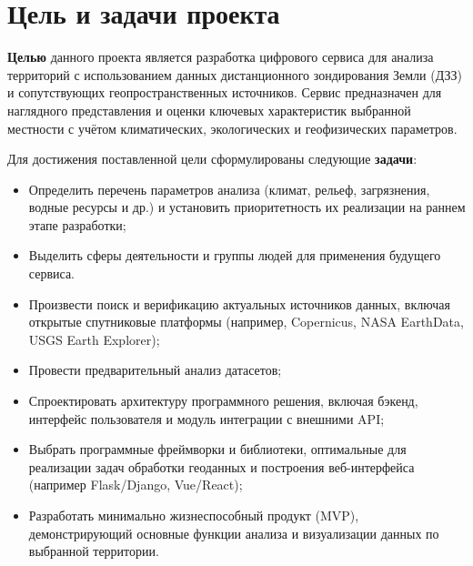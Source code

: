 \section{Цель и задачи проекта}

\textbf{Целью} данного проекта является разработка цифрового сервиса для анализа территорий с использованием данных дистанционного зондирования Земли (ДЗЗ) и сопутствующих геопространственных источников. Сервис предназначен для наглядного представления и оценки ключевых характеристик выбранной местности с учётом климатических, экологических и геофизических параметров.

Для достижения поставленной цели сформулированы следующие \textbf{задачи}:

\begin{itemize}
	\item Определить перечень параметров анализа (климат, рельеф, загрязнения, водные ресурсы и др.) и установить приоритетность их реализации на раннем этапе разработки;
	\item Выделить сферы деятельности и группы людей для применения будущего сервиса.
	\item Произвести поиск и верификацию актуальных источников данных, включая открытые спутниковые платформы (например, Copernicus, NASA EarthData, USGS Earth Explorer);
	\item Провести предварительный анализ датасетов;
	\item Спроектировать архитектуру программного решения, включая бэкенд, интерфейс пользователя и модуль интеграции с внешними API;
	\item Выбрать программные фреймворки и библиотеки, оптимальные для реализации задач обработки геоданных и построения веб-интерфейса (например Flask/Django, Vue/React);
	\item Разработать минимально жизнеспособный продукт (MVP), демонстрирующий основные функции анализа и визуализации данных по выбранной территории.
\end{itemize}
